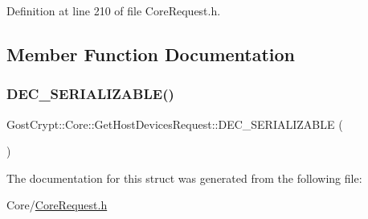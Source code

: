Definition at line 210 of file Core\+Request.\+h.



\subsection{Member Function Documentation}
\mbox{\label{struct_gost_crypt_1_1_core_1_1_get_host_devices_request_a64b6f5579ca7a7784fc246109d581073}} 
\subsubsection{\texorpdfstring{D\+E\+C\+\_\+\+S\+E\+R\+I\+A\+L\+I\+Z\+A\+B\+L\+E()}{DEC\_SERIALIZABLE()}}
{\footnotesize\ttfamily Gost\+Crypt\+::\+Core\+::\+Get\+Host\+Devices\+Request\+::\+D\+E\+C\+\_\+\+S\+E\+R\+I\+A\+L\+I\+Z\+A\+B\+LE (\begin{DoxyParamCaption}\item[{\hyperlink{struct_gost_crypt_1_1_core_1_1_get_host_devices_request}{Get\+Host\+Devices\+Request}}]{ }\end{DoxyParamCaption})}



The documentation for this struct was generated from the following file\+:\begin{DoxyCompactItemize}
\item 
Core/\hyperlink{_core_request_8h}{Core\+Request.\+h}\end{DoxyCompactItemize}
